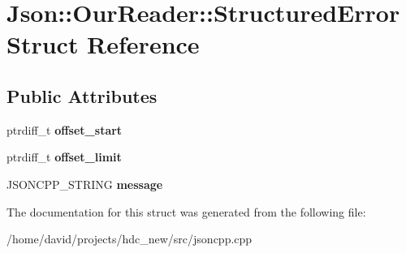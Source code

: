 \hypertarget{struct_json_1_1_our_reader_1_1_structured_error}{}\section{Json\+:\+:Our\+Reader\+:\+:Structured\+Error Struct Reference}
\label{struct_json_1_1_our_reader_1_1_structured_error}
\subsection*{Public Attributes}
\begin{DoxyCompactItemize}
\item 
ptrdiff\+\_\+t {\bfseries offset\+\_\+start}\hypertarget{struct_json_1_1_our_reader_1_1_structured_error_a102677698afb8177c985e72dafe72b15}{}\label{struct_json_1_1_our_reader_1_1_structured_error_a102677698afb8177c985e72dafe72b15}

\item 
ptrdiff\+\_\+t {\bfseries offset\+\_\+limit}\hypertarget{struct_json_1_1_our_reader_1_1_structured_error_a15491a751a39c5153af04e68b1d0abb9}{}\label{struct_json_1_1_our_reader_1_1_structured_error_a15491a751a39c5153af04e68b1d0abb9}

\item 
J\+S\+O\+N\+C\+P\+P\+\_\+\+S\+T\+R\+I\+NG {\bfseries message}\hypertarget{struct_json_1_1_our_reader_1_1_structured_error_a9d0b9986bf765d067dfcf2f971a450d1}{}\label{struct_json_1_1_our_reader_1_1_structured_error_a9d0b9986bf765d067dfcf2f971a450d1}

\end{DoxyCompactItemize}


The documentation for this struct was generated from the following file\+:\begin{DoxyCompactItemize}
\item 
/home/david/projects/hdc\+\_\+new/src/jsoncpp.\+cpp\end{DoxyCompactItemize}

